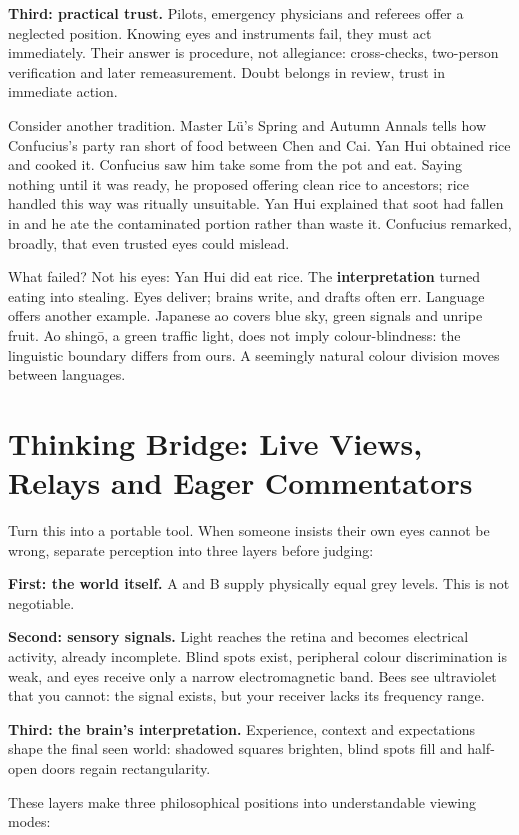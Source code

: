 \textbf{Third: practical trust.} Pilots, emergency physicians and referees offer a neglected position. Knowing eyes and instruments fail, they must act immediately. Their answer is procedure, not allegiance: cross-checks, two-person verification and later remeasurement. Doubt belongs in review, trust in immediate action.

Consider another tradition. Master Lü's Spring and Autumn Annals tells how Confucius's party ran short of food between Chen and Cai. Yan Hui obtained rice and cooked it. Confucius saw him take some from the pot and eat. Saying nothing until it was ready, he proposed offering clean rice to ancestors; rice handled this way was ritually unsuitable. Yan Hui explained that soot had fallen in and he ate the contaminated portion rather than waste it. Confucius remarked, broadly, that even trusted eyes could mislead.

What failed? Not his eyes: Yan Hui did eat rice. The \textbf{interpretation} turned eating into stealing. Eyes deliver; brains write, and drafts often err. Language offers another example. Japanese ao covers blue sky, green signals and unripe fruit. Ao shingō, a green traffic light, does not imply colour-blindness: the linguistic boundary differs from ours. A seemingly natural colour division moves between languages.

\section[Thinking Bridge: Three Viewing Layers]{Thinking Bridge: Live Views, Relays and Eager Commentators}
Turn this into a portable tool. When someone insists their own eyes cannot be wrong, separate perception into three layers before judging:

\textbf{First: the world itself.} A and B supply physically equal grey levels. This is not negotiable.

\textbf{Second: sensory signals.} Light reaches the retina and becomes electrical activity, already incomplete. Blind spots exist, peripheral colour discrimination is weak, and eyes receive only a narrow electromagnetic band. Bees see ultraviolet that you cannot: the signal exists, but your receiver lacks its frequency range.

\textbf{Third: the brain's interpretation.} Experience, context and expectations shape the final seen world: shadowed squares brighten, blind spots fill and half-open doors regain rectangularity.

These layers make three philosophical positions into understandable viewing modes:

